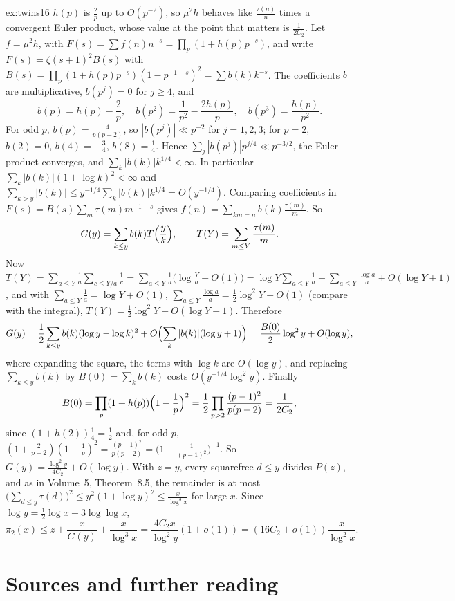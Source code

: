 \begin{solution}{ex:twins16}
\idea $h(p)$ is $\frac2p$ up to $O(p^{-2})$, so $\mu^2h$ behaves like $\frac{\tau(n)}n$ times a convergent Euler product, whose value at the point that matters is $\frac1{2C_2}$.
\writeup Let $f=\mu^2h$, with $F(s)=\sum f(n)n^{-s}=\prod_p(1+h(p)p^{-s})$, and write $F(s)=\zeta(s+1)^2B(s)$ with $B(s)=\prod_p(1+h(p)p^{-s})(1-p^{-1-s})^2=\sum b(k)k^{-s}$. The coefficients $b$ are multiplicative, $b(p^j)=0$ for $j\ge4$, and
\[
b(p)=h(p)-\frac2p,\quad b(p^2)=\frac1{p^2}-\frac{2h(p)}p,\quad b(p^3)=\frac{h(p)}{p^2}.
\]
For odd $p$, $b(p)=\frac4{p(p-2)}$, so $|b(p^j)|\ll p^{-2}$ for $j=1,2,3$; for $p=2$, $b(2)=0$, $b(4)=-\frac34$, $b(8)=\frac14$. Hence $\sum_j|b(p^j)|p^{j/4}\ll p^{-3/2}$, the Euler product converges, and $\sum_k|b(k)|k^{1/4}<\infty$. In particular $\sum_k|b(k)|(1+\log k)^2<\infty$ and $\sum_{k>y}|b(k)|\le y^{-1/4}\sum_k|b(k)|k^{1/4}=O(y^{-1/4})$.
Comparing coefficients in $F(s)=B(s)\sum_m\tau(m)m^{-1-s}$ gives $f(n)=\sum_{km=n}b(k)\frac{\tau(m)}m$. So
\[
G(y)=\sum_{k\le y}b(k)T\Bigl(\frac yk\Bigr),\qquad T(Y)=\sum_{m\le Y}\frac{\tau(m)}m.
\]
Now $T(Y)=\sum_{a\le Y}\frac1a\sum_{c\le Y/a}\frac1c=\sum_{a\le Y}\frac1a\bigl(\log\frac Ya+O(1)\bigr)=\log Y\sum_{a\le Y}\frac1a-\sum_{a\le Y}\frac{\log a}a+O(\log Y+1)$, and with $\sum_{a\le Y}\frac1a=\log Y+O(1)$, $\sum_{a\le Y}\frac{\log a}a=\frac12\log^2Y+O(1)$ (compare with the integral), $T(Y)=\frac12\log^2Y+O(\log Y+1)$. Therefore
\[
G(y)=\frac12\sum_{k\le y}b(k)(\log y-\log k)^2+O\Bigl(\sum_k|b(k)|(\log y+1)\Bigr)=\frac{B(0)}2\log^2y+O(\log y),
\]
where expanding the square, the terms with $\log k$ are $O(\log y)$, and replacing $\sum_{k\le y}b(k)$ by $B(0)=\sum_kb(k)$ costs $O(y^{-1/4}\log^2y)$. Finally
\[
B(0)=\prod_p(1+h(p))\Bigl(1-\frac1p\Bigr)^2=\frac12\prod_{p>2}\frac{(p-1)^2}{p(p-2)}=\frac1{2C_2},
\]
since $(1+h(2))\frac14=\frac12$ and, for odd $p$, $(1+\frac2{p-2})(1-\frac1p)^2=\frac{(p-1)^2}{p(p-2)}=\bigl(1-\frac1{(p-1)^2}\bigr)^{-1}$. So $G(y)=\frac{\log^2y}{4C_2}+O(\log y)$.
With $z=y$, every squarefree $d\le y$ divides $P(z)$, and as in Volume~5, Theorem~8.5, the remainder is at most $\bigl(\sum_{d\le y}\tau(d)\bigr)^2\le y^2(1+\log y)^2\le\frac x{\log^3x}$ for large $x$. Since $\log y=\frac12\log x-3\log\log x$,
\[
\pi_2(x)\le z+\frac x{G(y)}+\frac x{\log^3x}=\frac{4C_2x}{\log^2y}(1+o(1))=(16C_2+o(1))\frac x{\log^2x}.
\]
\end{solution}

\section*{Sources and further reading}

